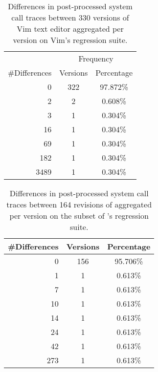 \begin{table}
  \centering
  \begin{tabular}{r @{\qquad}c c}
    \toprule
    & \multicolumn{2}{c}{Frequency} \\
    \cmidrule(r){2-3}
    \#Differences & Versions & Percentage \\
    \midrule
    0 & 322 & 97.872\% \\
    2 & 2 & 0.608\% \\
    3 & 1 & 0.304\% \\
    16 & 1 & 0.304\% \\ 
    69 & 1 & 0.304\% \\
    182 & 1 & 0.304\% \\
    3489 & 1 & 0.304\% \\
    \bottomrule
  \end{tabular}
  \caption{Differences in post-processed system call traces between 330
  versions of Vim text editor aggregated per version on Vim's regression
  suite.}
  \label{tab:perversion}
\end{table}

\begin{table}
  \centering
  \begin{tabular}{r @{\qquad}c c}
    \hline
    \#Differences & Versions & Percentage \\
    \hline
    0 & 156 & 95.706\% \\
    1 & 1 & 0.613\% \\
    7 & 1 & 0.613\% \\
    10 & 1 & 0.613\% \\ 
    14 & 1 & 0.613\% \\
    24 & 1 & 0.613\% \\
    42 & 1 & 0.613\% \\
    273 & 1 & 0.613\% \\
    \hline
  \end{tabular}
  \caption{Differences in post-processed system call traces between 164
  revisions of \lighttpd aggregated per version on the subset of \lighttpd's
  regression suite.}
  \label{tab:perversion}
\end{table}


